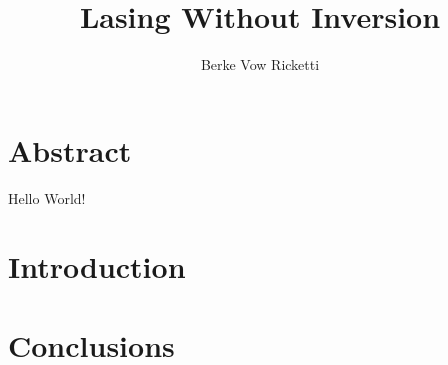 \documentclass{article}
\title{Lasing Without Inversion}
\author{Berke Vow Ricketti}
\begin{document}
\maketitle{}





\section{Abstract}

Hello World!

\section{Introduction}


\section{Conclusions}
\end{document}
